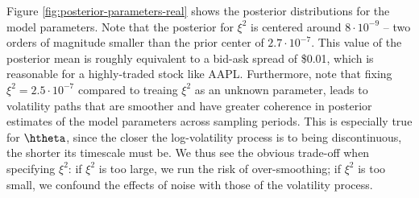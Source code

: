 Figure \ref{fig:posterior-parameters-real} shows the posterior distributions for the model parameters.   Note that the posterior for $\xi^2$ is centered around $8 \cdot 10^{-9}$ -- two orders of magnitude smaller than the prior center of $2.7 \cdot 10^{-7}$. This value of the posterior mean is roughly equivalent to a bid-ask spread of \$0.01, which is reasonable for a highly-traded stock like AAPL.  Furthermore, note that fixing $\xi^2 = 2.5\cdot 10^{-7}$ compared to treaing $\xi^2$ as an unknown parameter, leads to volatility paths that are smoother and have greater coherence in posterior estimates of the model parameters across sampling periods.  This is especially true for $\htheta$, since the closer the log-volatility process is to being discontinuous, the shorter its timescale must be.  We thus see the obvious trade-off when specifying $\xi^2$: if $\xi^2$ is too large, we run the risk of over-smoothing; if $\xi^2$ is too small, we confound the effects of noise with those of the volatility process.

